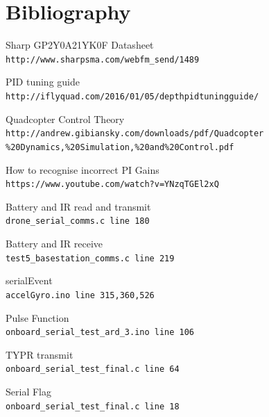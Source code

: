 \documentclass[a4paper,11pt]{article}
\begin{document}
\section{Bibliography}
\begin{thebibliography}{20}
 
Sharp GP2Y0A21YK0F Datasheet\\
\texttt{http://www.sharpsma.com/webfm\_send/1489}

PID tuning guide\\
\texttt{http://iflyquad.com/2016/01/05/depth\-pid\-tuning\-guide/}

Quadcopter Control Theory\\
\texttt{http://andrew.gibiansky.com/downloads/pdf/Quadcopter\\\%20Dynamics,\%20Simulation,\%20and\%20Control.pdf}

How to recognise incorrect PI Gains\\
\texttt{https://www.youtube.com/watch?v=YNzqTGEl2xQ}

Battery and IR read and transmit\\
\texttt{drone\_serial\_comms.c line 180}

Battery and IR receive\\
\texttt{test5\_basestation\_comms.c line 219}

serialEvent\\
\texttt{accelGyro.ino line 315,360,526}

Pulse Function\\
\texttt{onboard\_serial\_test\_ard\_3.ino line 106}

TYPR transmit\\
\texttt{onboard\_serial\_test\_final.c line 64}

Serial Flag\\
\texttt{onboard\_serial\_test\_final.c line 18}


\end{thebibliography}

\newpage
\end{document}
